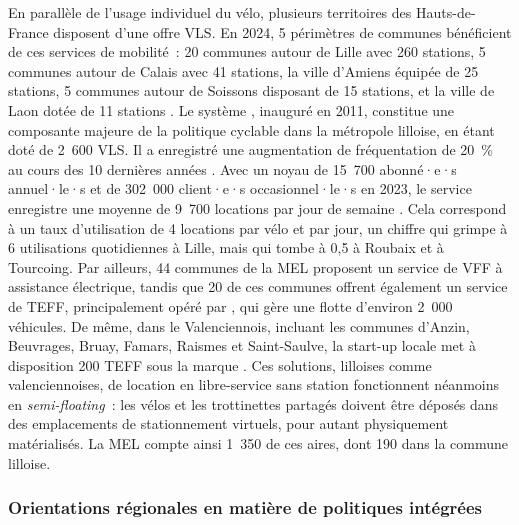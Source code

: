 \begin{refsegment}
En parallèle de l’usage individuel du vélo, plusieurs territoires des Hauts-de-France disposent d’une offre \acrshort{VLS}. En 2024, 5 périmètres de communes bénéficient de ces services de mobilité~: 20 communes autour de Lille avec 260 stations, 5 communes autour de Calais avec 41 stations, la ville d’Amiens équipée de 25 stations, 5 communes autour de Soissons disposant de 15 stations, et la ville de Laon dotée de 11 stations \textcolor{blue}{\autocite[41]{region_hauts-de-france_plan_2023}}. Le système , inauguré en 2011, constitue une composante majeure de la politique cyclable dans la métropole lilloise, en étant doté de 2~600 \acrshort{VLS}. Il a enregistré une augmentation de fréquentation de 20~\% au cours des 10 dernières années \textcolor{blue}{\autocite[1]{metropole_europeenne_de_lille_vlille_2021}}. Avec un noyau de 15~700 abonné·e·s annuel·le·s et de 302~000 client·e·s occasionnel·le·s en 2023, le service enregistre une moyenne de 9~700 locations par jour de semaine \textcolor{blue}{\autocite{berges_plus_2023}}. Cela correspond à un taux d’utilisation de 4 locations par vélo et par jour, un chiffre qui grimpe à 6 utilisations quotidiennes à Lille, mais qui tombe à 0,5 à Roubaix et à Tourcoing. Par ailleurs, 44 communes de la \acrshort{MEL} proposent un service de \acrshort{VFF} à assistance électrique, tandis que 20 de ces communes offrent également un service de \acrshort{TEFF}, principalement opéré par , qui gère une flotte d’environ 2~000 véhicules. De même, dans le Valenciennois, incluant les communes d’Anzin, Beuvrages, Bruay, Famars, Raismes et Saint-Saulve, la start-up locale  met à disposition 200 \acrshort{TEFF} sous la marque . Ces solutions, lilloises comme valenciennoises, de location en libre-service sans station fonctionnent néanmoins en \textsl{semi-floating}~: les vélos et les trottinettes partagés doivent être déposés dans des emplacements de stationnement virtuels, pour autant physiquement matérialisés. La \acrshort{MEL} compte ainsi 1~350 de ces aires, dont 190 dans la commune lilloise.%

\subsubsection*{Orientations régionales en matière de politiques intégrées
    \label{chap3:region-hdf-politiques}
    }


\end{refsegment}
